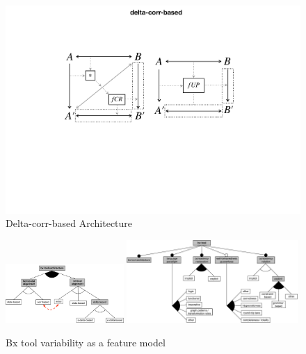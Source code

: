 \begin{figure}[tb!]
	\centering
	\includegraphics[width=0.75\columnwidth]{diagrams/foundations/delta-corr-based}
	\caption{Delta-corr-based Architecture}
	\label{fig:deltaCorrBased}
\end{figure}

\begin{figure}[tb!]
	\centering
	\includegraphics[width=0.4\textwidth]{diagrams/foundations/feature-model-bx-tool-architecture}
	\includegraphics[width=0.58\textwidth]{diagrams/foundations/feature-model-bx-tool}
	\caption{Bx tool variability as a feature model}
	\label{fig:featureModelBxTools}
\end{figure}

\clearpage